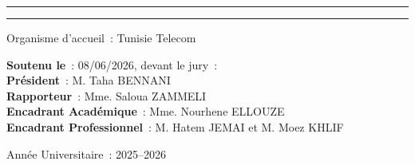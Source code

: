 \begin{titlepage}
    \textcolor{customblue}{\rule{\textwidth}{0.4pt}}\vspace*{-\baselineskip}\vspace{3.6pt}
    \textcolor{customblue}{\rule{\textwidth}{1.6pt}}

    \vspace{0.75\baselineskip}

    {\large Organisme d'accueil~: Tunisie Telecom}

     \begin{flushleft}
        {\normalsize \textbf{Soutenu le}~: 08/06/2026, devant le jury~:}\\
        {\normalsize \textbf{Président}~: M. Taha BENNANI}\\
        {\normalsize \textbf{Rapporteur}~: Mme. Saloua ZAMMELI}\\
        {\normalsize \textbf{Encadrant Académique}~: Mme. Nourhene ELLOUZE}\\
        {\normalsize \textbf{Encadrant Professionnel}~: M. Hatem JEMAI et M. Moez KHLIF}
    \end{flushleft}

    \vfill

    \fbox{
    \begin{minipage}{150pt}
        \centering
        \vspace{8pt}
        {\Large IOT - 3126017}
        \vspace{8pt}
    \end{minipage}
    }

    \vspace{1cm}

    {\large Année Universitaire~: 2025--2026}

\end{titlepage}
